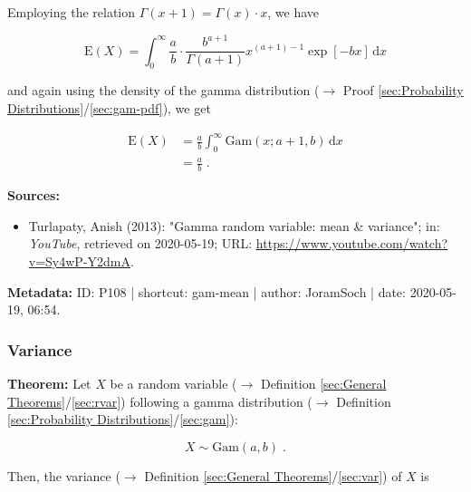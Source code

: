 \documentclass[a4paper,12pt,twoside]{book}
\begin{document}
Employing the relation $\Gamma(x+1) = \Gamma(x) \cdot x$, we have

\begin{equation} \label{eq:gam-mean-gam-mean-s2}
\mathrm{E}(X) = \int_{0}^{\infty} \frac{a}{b} \cdot \frac{b^{a+1}}{\Gamma(a+1)} x^{(a+1)-1} \exp[-b x] \, \mathrm{d}x
\end{equation}

and again using the density of the gamma distribution ($\rightarrow$ Proof \ref{sec:Probability Distributions}/\ref{sec:gam-pdf}), we get

\begin{equation} \label{eq:gam-mean-gam-mean-s3}
\begin{split}
\mathrm{E}(X) &= \frac{a}{b} \int_{0}^{\infty} \mathrm{Gam}(x; a+1, b) \, \mathrm{d}x \\
&= \frac{a}{b} \; .
\end{split}
\end{equation}


\vspace{1em}
\textbf{Sources:}
\begin{itemize}
\item Turlapaty, Anish (2013): "Gamma random variable: mean \& variance"; in: \textit{YouTube}, retrieved on 2020-05-19; URL: \url{https://www.youtube.com/watch?v=Sy4wP-Y2dmA}.
\end{itemize}


\vspace{1em}
\textbf{Metadata:} ID: P108 | shortcut: gam-mean | author: JoramSoch | date: 2020-05-19, 06:54.
\vspace{1em}



\subsubsection[\textbf{Variance}]{Variance} \label{sec:gam-var}
\setcounter{equation}{0}

\textbf{Theorem:} Let $X$ be a random variable ($\rightarrow$ Definition \ref{sec:General Theorems}/\ref{sec:rvar}) following a gamma distribution ($\rightarrow$ Definition \ref{sec:Probability Distributions}/\ref{sec:gam}):

\begin{equation} \label{eq:gam-var-gam}
X \sim \mathrm{Gam}(a, b) \; .
\end{equation}

Then, the variance ($\rightarrow$ Definition \ref{sec:General Theorems}/\ref{sec:var}) of $X$ is
\end{document}
